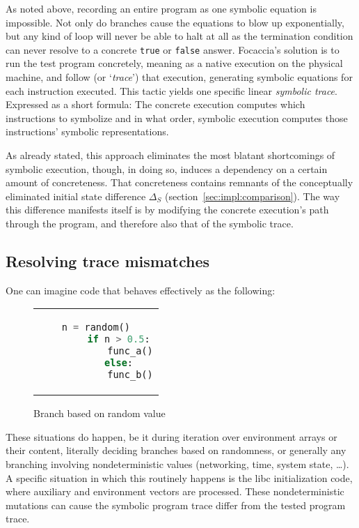 As noted above, recording an entire program as one symbolic equation is impossible. Not only do branches cause the
equations to blow up exponentially, but any kind of loop will never be able to halt at all as the termination condition
can never resolve to a concrete \texttt{true} or \texttt{false} answer. Focaccia's solution is to run the test program
concretely, meaning as a native execution on the physical machine, and follow (or `\textit{trace}') that execution,
generating symbolic equations for each instruction executed. This tactic yields one specific linear \textit{symbolic
trace}. Expressed as a short formula: The concrete execution computes which instructions to symbolize and in what order,
symbolic execution computes those instructions' symbolic representations.

As already stated, this approach eliminates the most blatant shortcomings of symbolic execution, though, in doing so,
induces a dependency on a certain amount of concreteness. That concreteness contains remnants of the conceptually
eliminated initial state difference $\Delta_S$ (section~\ref{sec:impl:comparison}). The way this difference manifests
itself is by modifying the concrete execution's path through the program, and therefore also that of the symbolic trace.

\subsection{Resolving trace mismatches}\label{sec:impl:trace_mismatch}

One can imagine code that behaves effectively as the following:

\begin{figure}[htbp]
    \centering
    \begin{tabular}{c}
    \begin{lstlisting}[language=Python]
        n = random()
        if n > 0.5:
            func_a()
        else:
            func_b()
    \end{lstlisting}
    \end{tabular}
    \caption[Random Branching]{Branch based on random value}\label{fig:random_branching}
\end{figure}

These situations do happen, be it during iteration over environment arrays or their content, literally deciding branches
based on randomness, or generally any branching involving nondeterministic values (networking, time, system state, …). A
specific situation in which this routinely happens is the libc initialization code, where auxiliary and environment
vectors are processed. These nondeterministic mutations can cause the symbolic program trace differ from the tested
program trace.

